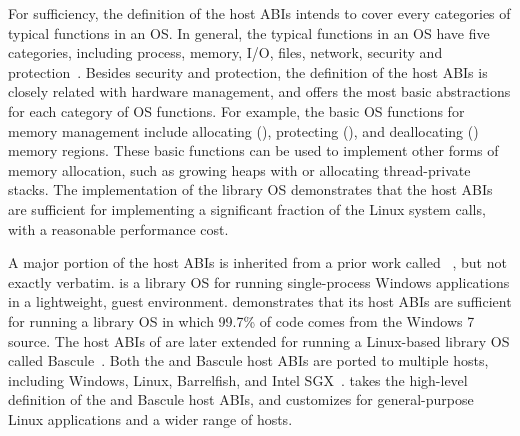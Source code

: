 For sufficiency, the definition of the host ABIs
intends to cover every categories of typical functions in an OS.
In general, the typical functions in an OS
have five categories,
including
process, memory, I/O, files, network, security and protection~\cite{dhamdhere2007os-textbook}.
Besides security and protection,
the definition of the host ABIs is closely related with hardware management,
and offers the most basic abstractions for each category of OS functions.
For example, the basic OS functions for memory management include
allocating (),
protecting (),
and deallocating () memory regions. %
These basic functions can be used to implement other forms of memory allocation,
such as growing heaps with 
or allocating thread-private stacks.
The implementation of the \graphene{} library OS demonstrates that
the host ABIs are sufficient for implementing a significant fraction of the Linux system calls, with a reasonable performance cost.

A major portion of 
the host ABIs is inherited from a prior work called \drawbridge{}~\cite{porter11drawbridge}, but not exactly verbatim.
\drawbridge{} is a library OS for running single-process Windows applications
in a lightweight, guest environment.
\drawbridge{} demonstrates that its host ABIs are sufficient
for running a library OS in which 99.7\% of code comes from the Windows 7 source.
The host ABIs of \drawbridge{} are later extended
for running a Linux-based library OS called Bascule~\cite{baumann13bascule}.
Both the \drawbridge{} and Bascule host ABIs are ported to multiple hosts, including Windows, Linux, Barrelfish, and Intel SGX~\cite{porter11drawbridge,baumann14haven,mssql-on-linux,baumann13bascule}.
\graphene{} takes the high-level definition of the
\drawbridge{} and Bascule host ABIs, and customizes for general-purpose Linux applications and a wider range of hosts. 




